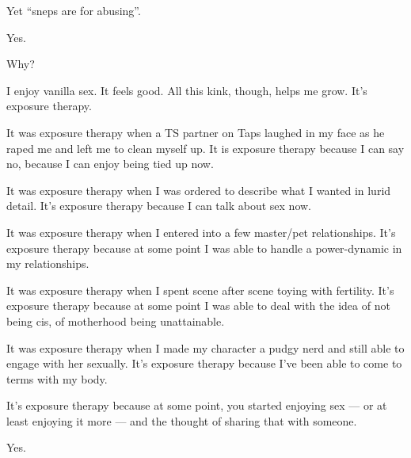 \begin{ally}
Yet ``sneps are for abusing''.
\end{ally}
Yes.

\begin{ally}
Why?
\end{ally}
I enjoy vanilla sex. It feels good. All this kink, though, helps me grow. It's exposure therapy.

It was exposure therapy when a TS partner on Taps laughed in my face as he raped me and left me to clean myself up. It is exposure therapy because I can say no, because I can enjoy being tied up now.

It was exposure therapy when I was ordered to describe what I wanted in lurid detail. It's exposure therapy because I can talk about sex now.

It was exposure therapy when I entered into a few master/pet relationships. It's exposure therapy because at some point I was able to handle a power-dynamic in my relationships.

It was exposure therapy when I spent scene after scene toying with fertility. It's exposure therapy because at some point I was able to deal with the idea of not being cis, of motherhood being unattainable.

It was exposure therapy when I made my character a pudgy nerd and still able to engage with her sexually. It's exposure therapy because I've been able to come to terms with my body.

\begin{ally}
It's exposure therapy because at some point, you started enjoying sex --- or at least enjoying it more --- and the thought of sharing that with someone.
\end{ally}
Yes.
\newpage
